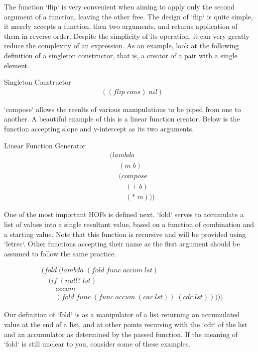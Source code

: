 The function `flip` is very convenient when aiming to apply only the second 
argument of a function, leaving the other free. The design of `flip` is quite 
simple, it merely accepts a function, then two arguments, and returns application 
of them in reverse order. Despite the simplicity of its operation, it can very 
greatly reduce the complexity of an expression. As an example, look at the 
following definition of a singleton constructor, that is, a creator of a pair with 
a single element.

Singleton Constructor
\begin{align*}
& ((flip \; cons) \; nil)
\end{align*}


`compose` allows the results of various manipulations to be piped from one to 
another. A beautiful example of this is a linear function creator. Below is the 
function accepting slope and y-intercept as its two arguments.

Linear Function Generator
\begin{align*}
& (lambda \; 
\\& \quad \; (m \; b) \; 
\\& \quad \; (compose \; 
\\& \qquad \; (+ \; b) \; 
\\& \qquad \; (* \; m)))
\end{align*}

One of the most important HOFs is defined next. `fold` serves to accumulate a list 
of values into a single resultant value, based on a function of combination and a 
starting value. Note that this function is recursive and will be provided using 
`letrec`. Other functions accepting their name as the first argument should be 
assumed to follow the same practice.

\begin{align*}
& (fold \; (lambda \; (fold \; func \; accum \; lst)
\\& \quad (if \; (null? \; lst)
\\& \qquad accum
\\& \qquad (fold \; func \; (func \; accum \; (car \; lst)) \; (cdr \; lst)))))
\end{align*}

Our definition of `fold` is as a manipulator of a list returning an accumulated 
value at the end of a list, and at other points recursing with the `cdr` of the 
list and an accumulator as determined by the passed function. If the meaning of 
`fold` is still unclear to you, consider some of these examples.

